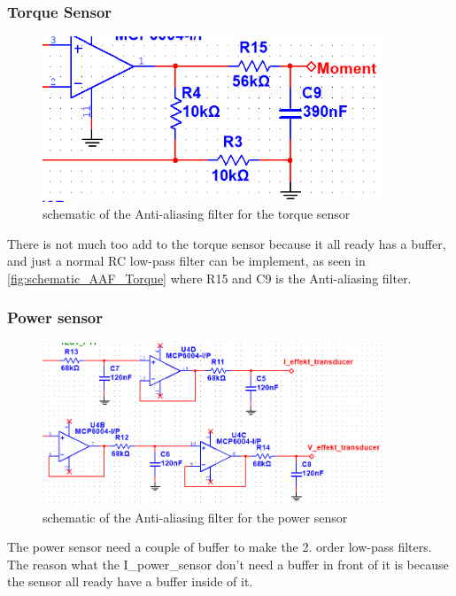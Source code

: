 \subsubsection*{Torque Sensor}
	
\begin{figure}[H]
	\centering
	\includegraphics [width=4in]{Hardware/Pictures/AAF_moment.PNG}
	\caption{schematic of the Anti-aliasing filter for the torque sensor}
	\label{fig:schematic_AAF_Torque}
\end{figure}
	
There is not much too add to the torque sensor because it all ready has a buffer, and just a normal RC low-pass filter can be implement, as seen in \vref{fig:schematic_AAF_Torque} where R15 and C9 is the Anti-aliasing filter.
	
\subsubsection*{Power sensor}

\begin{figure}[H]
	\centering
	\includegraphics [width=4in]{Hardware/Pictures/AAF_effekt.PNG}
	\caption{schematic of the Anti-aliasing filter for the power sensor}
	\label{fig:schematic_AAF_power}
\end{figure}
	
The power sensor need a couple of buffer to make the 2. order low-pass filters. The reason what the I\_power\_sensor don't need a buffer in front of it is because the sensor all ready have a buffer inside of it.   